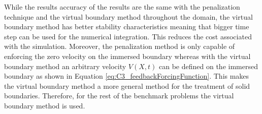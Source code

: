 While the results accuracy of the results are the same with the penalization technique and the virtual boundary method throughout the domain, the virtual boundary method has better stability characteristics meaning that bigger time step can be used for the numerical integration. This reduces the cost associated with the simulation. Moreover, the penalization method is only capable of enforcing the zero velocity on the immersed boundary whereas with the virtual boundary method an arbitrary velocity $V(X, t)$ can be defined on the immersed boundary as shown in Equation \eqref{eq:C3_feedbackForcingFunction}. This makes the virtual boundary method a more general method for the treatment of solid boundaries. Therefore, for the rest of the benchmark problems the virtual boundary method is used.